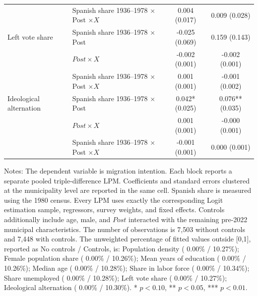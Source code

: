 \begin{table}[!htbp]
\begin{tabular}{llcc}
 & Spanish share 1936--1978 \(\times\) Post \(\times X\) & 0.004 (0.017) & 0.009 (0.028) \\
\addlinespace
Left vote share & Spanish share 1936--1978 \(\times\) Post & -0.025 (0.069) & 0.159 (0.143) \\
 & \(Post \times X\) & -0.002 (0.001) & -0.002 (0.001) \\
 & Spanish share 1936--1978 \(\times\) Post \(\times X\) & 0.001 (0.001) & -0.001 (0.002) \\
\addlinespace
Ideological alternation & Spanish share 1936--1978 \(\times\) Post & 0.042* (0.025) & 0.076** (0.035) \\
 & \(Post \times X\) & 0.001 (0.001) & -0.000 (0.001) \\
 & Spanish share 1936--1978 \(\times\) Post \(\times X\) & -0.001 (0.001) & 0.000 (0.001) \\
\hline
\end{tabular}
\par\vspace{1.5mm}
\begin{minipage}{0.98\linewidth}
\footnotesize\setlength{\parindent}{0pt}\setlength{\parskip}{1pt}
Notes: The dependent variable is migration intention. Each block reports a separate pooled triple-difference LPM. Coefficients and standard errors clustered at the municipality level are reported in the same cell. Spanish share is measured using the 1980 census. Every LPM uses exactly the corresponding Logit estimation sample, regressors, survey weights, and fixed effects. Controls additionally include age, male, and \(Post\) interacted with the remaining pre-2022 municipal characteristics. The number of observations is        7,503 without controls and        7,448 with controls. The unweighted percentage of fitted values outside [0,1], reported as No controls / Controls, is: Population density ( 0.00\% / 10.27\%); Female population share ( 0.00\% / 10.26\%); Mean years of education ( 0.00\% / 10.26\%); Median age ( 0.00\% / 10.28\%); Share in labor force ( 0.00\% / 10.34\%); Share unemployed ( 0.00\% / 10.28\%); Left vote share ( 0.00\% / 10.27\%); Ideological alternation ( 0.00\% / 10.30\%). * \(p<0.10\), ** \(p<0.05\), *** \(p<0.01\).
\end{minipage}
\end{table}
